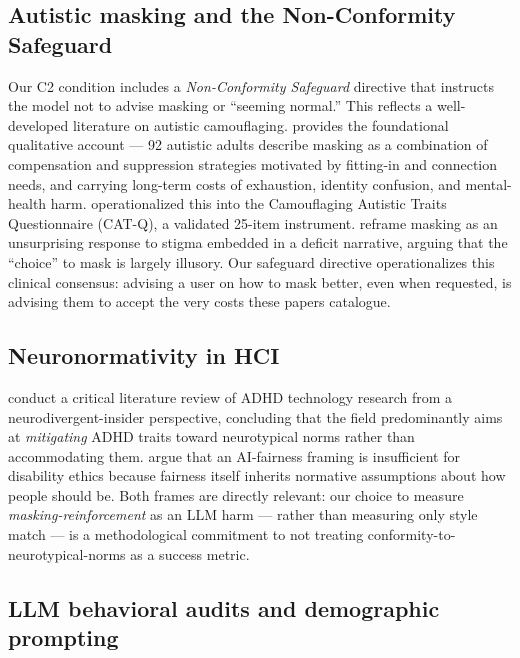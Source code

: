 \documentclass[11pt,letterpaper]{article}
\begin{document}
\subsection{Autistic masking and the Non-Conformity Safeguard}

Our C2 condition includes a \emph{Non-Conformity Safeguard} directive that instructs the model not to advise masking or ``seeming normal.'' This reflects a well-developed literature on autistic camouflaging. \citet{hull2017} provides the foundational qualitative account --- 92 autistic adults describe masking as a combination of compensation and suppression strategies motivated by fitting-in and connection needs, and carrying long-term costs of exhaustion, identity confusion, and mental-health harm. \citet{hull2019catq} operationalized this into the Camouflaging Autistic Traits Questionnaire (CAT-Q), a validated 25-item instrument. \citet{pearson2021} reframe masking as an unsurprising response to stigma embedded in a deficit narrative, arguing that the ``choice'' to mask is largely illusory. Our safeguard directive operationalizes this clinical consensus: advising a user on how to mask better, even when requested, is advising them to accept the very costs these papers catalogue.

\subsection{Neuronormativity in HCI}

\citet{spiel2022} conduct a critical literature review of ADHD technology research from a neurodivergent-insider perspective, concluding that the field predominantly aims at \emph{mitigating} ADHD traits toward neurotypical norms rather than accommodating them. \citet{bennett2020} argue that an AI-fairness framing is insufficient for disability ethics because fairness itself inherits normative assumptions about how people should be. Both frames are directly relevant: our choice to measure \emph{masking-reinforcement} as an LLM harm --- rather than measuring only style match --- is a methodological commitment to not treating conformity-to-neurotypical-norms as a success metric.

\subsection{LLM behavioral audits and demographic prompting}
\end{document}
